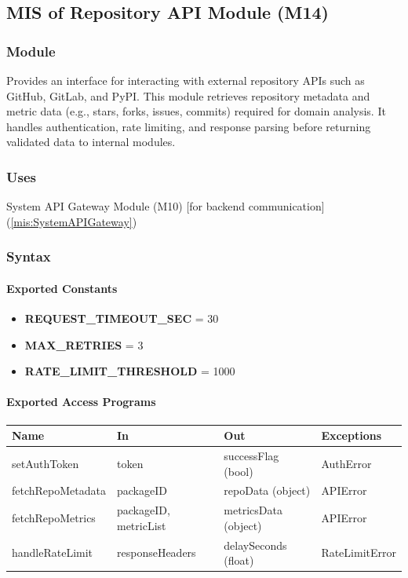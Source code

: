 \documentclass[12pt, titlepage]{article}
\begin{document}
\begin{itemize}
\subsection{MIS of Repository API Module (M14)}
  \label{mis:RepositoryAPIModule}

  \subsubsection{Module}
  Provides an interface for interacting with external repository APIs such as GitHub, GitLab, and PyPI.
  This module retrieves repository metadata and metric data (e.g., stars, forks, issues, commits) required for domain analysis.
  It handles authentication, rate limiting, and response parsing before returning validated data to internal modules.

  \subsubsection{Uses}
  System API Gateway Module (M10) [for backend communication] (\ref{mis:SystemAPIGateway})\\

  \subsubsection{Syntax}

  \paragraph{Exported Constants}
  \begin{itemize}
    \item \textbf{REQUEST\_TIMEOUT\_SEC} = 30
    \item \textbf{MAX\_RETRIES} = 3
    \item \textbf{RATE\_LIMIT\_THRESHOLD} = 1000
  \end{itemize}

  \paragraph{Exported Access Programs}
  \begin{center}
  \renewcommand{\arraystretch}{1.2}
  \begin{tabularx}{\textwidth}{l X X l}
  \toprule
  \textbf{Name} & \textbf{In} & \textbf{Out} & \textbf{Exceptions}\\
  \midrule
  setAuthToken & token & successFlag (bool) & AuthError \\
  fetchRepoMetadata & packageID & repoData (object) & APIError \\
  fetchRepoMetrics & packageID, metricList & metricsData (object) & APIError \\
  handleRateLimit & responseHeaders & delaySeconds (float) & RateLimitError \\
  \bottomrule
  \end{tabularx}
  \end{center}


\end{itemize}
\end{document}
